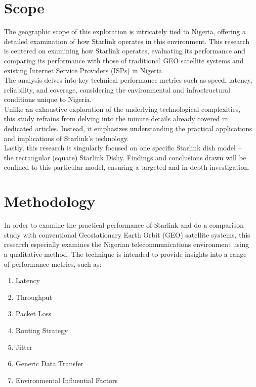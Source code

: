 \section{Scope}
The geographic scope of this exploration is intricately tied to Nigeria, offering a detailed examination of how Starlink operates in this environment. This research is centered on examining how Starlink operates, evaluating its performance and comparing its performance with those of traditional GEO satellite systems and existing Internet Service Providers (ISPs) in Nigeria. \\
The analysis delves into key technical performance metrics such as speed, latency, reliability, and coverage, considering the environmental and infrastructural conditions unique to Nigeria.\\
Unlike an exhaustive exploration of the underlying technological complexities, this study refrains from delving into the minute details already covered in dedicated articles. Instead, it emphasizes understanding the practical applications and implications of Starlink's technology.\\
Lastly, this research is singularly focused on one specific Starlink dish model – the rectangular (square) Starlink Dishy. Findings and conclusions drawn will be confined to this particular model, ensuring a targeted and in-depth investigation.\\
\section{Methodology}
In order to examine the practical performance of Starlink and do a comparison study with conventional Geostationary Earth Orbit (GEO) satellite systems, this research especially examines the Nigerian telecommunications environment using a qualitative method. The technique is intended to provide insights into a range of performance metrics, such as: 
\begin{enumerate}
\item Latency
\item Throughput
\item Packet Loss
\item Routing Strategy
\item Jitter
\item Generic Data Transfer
\item Environmental Influential Factors
\end{enumerate}
